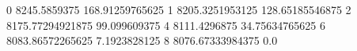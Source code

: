 0 8245.5859375 168.91259765625
1 8205.3251953125 128.65185546875
2 8175.77294921875 99.099609375
4 8111.4296875 34.75634765625
6 8083.86572265625 7.1923828125
8 8076.67333984375 0.0
